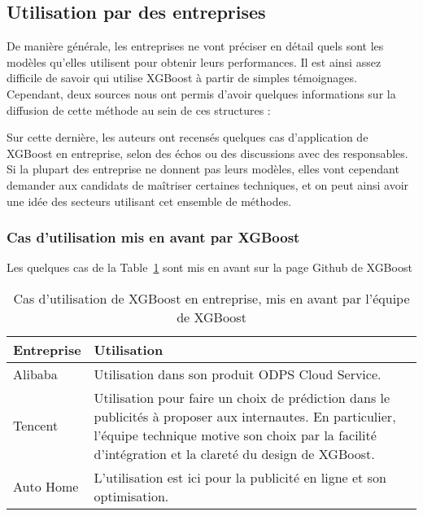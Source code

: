 \subsection{Utilisation par des entreprises}
De manière générale, les entreprises ne vont préciser en détail quels sont les modèles qu'elles utilisent pour obtenir leurs performances. Il est ainsi assez difficile de savoir qui utilise XGBoost à partir de simples témoignages. Cependant, deux sources nous ont permis d'avoir quelques informations sur la diffusion de cette méthode au sein de ces structures :\begin{itemize}
Sur cette dernière, les auteurs ont recensés quelques cas d'application de XGBoost en entreprise, selon des échos ou des discussions avec des responsables.
Si la plupart des entreprise ne donnent pas leurs modèles, elles vont cependant demander aux candidats de maîtriser certaines techniques, et on peut ainsi avoir une idée des secteurs utilisant cet ensemble de méthodes.
\end{itemize}
\subsubsection{Cas d'utilisation mis en avant par XGBoost}
Les quelques cas de la Table~\ref{tab:etps-xgboost} sont mis en avant sur la page Github de XGBoost

\begin{table}[h]
	\begin{margincap}
	\centering
	\begin{tabular}{p{}p{}}
		\toprule
		\textbf{Entreprise} & \textbf{Utilisation} \\
		\midrule
		Alibaba & Utilisation dans son produit ODPS Cloud Service. \\
		Tencent & Utilisation pour faire un choix de prédiction dans le publicités à proposer aux internautes. En particulier, l'équipe technique motive son choix par la facilité d'intégration et la clareté du design de XGBoost.\\
		Auto Home & L'utilisation est ici pour la publicité en ligne et son optimisation. \\
	\end{tabular}
	\caption{Cas d'utilisation de XGBoost en entreprise, mis en avant par l'équipe de XGBoost}
	\label{tab:etps-xgboost}
	\end{margincap}
\end{table}

